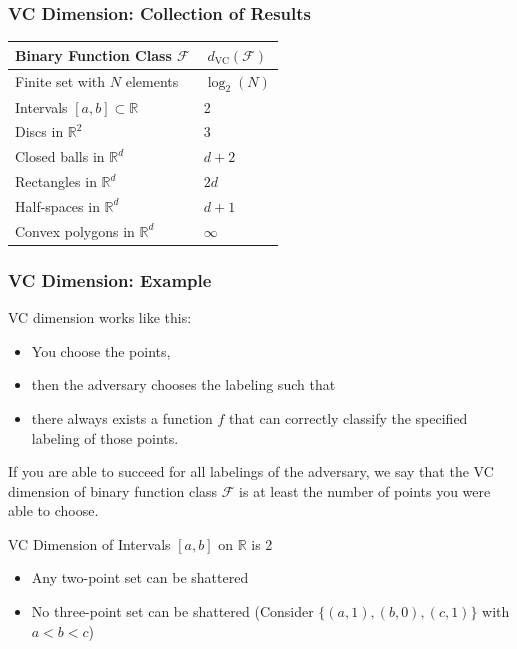 \documentclass{beamer}
\begin{document}

\begin{frame}
\frametitle{VC Dimension: Collection of Results} 

\begin{table}[]
\begin{tabular}{@{}ll@{}}
\toprule
\multicolumn{1}{c}{Binary Function Class $\mathcal{F}$} & \multicolumn{1}{c}{$d_{\text{VC}}(\mathcal{F})$} \\ \midrule
Finite set with $N$ elements & $\log_2(N)$ \\
Intervals $[a,b] \subset \mathbb{R}$ & 2 \\
Discs in $\mathbb{R}^2$ & 3 \\
Closed balls in $\mathbb{R}^d$ & $d+2$ \\
Rectangles in $\mathbb{R}^d$ & $2d$ \\
Half-spaces in $\mathbb{R}^d$ & $d+1$ \\
Convex polygons in $\mathbb{R}^d$ & $\infty$ \\ \bottomrule
\end{tabular}
\end{table}

\end{frame}


\begin{frame}
\frametitle{VC Dimension: Example} 

VC dimension works like this: 
\begin{itemize}
    \item You choose the points, 
    \item then the adversary chooses the labeling such that 
    \item there always exists a function $f$ that can correctly classify the specified labeling of those points.
\end{itemize}
If you are able to succeed for all labelings of the adversary, we say that the VC dimension of binary function class $\mathcal{F}$ is at least the number of points you were able to choose.
\begin{block}{VC Dimension of Intervals $[a, b]$ on $\mathbb{R}$ is 2}
\begin{itemize}
    \item Any two-point set can be shattered  
    \item No three-point set can be shattered (Consider $\{(a, 1), (b, 0), (c, 1)\}$ with $a < b < c$)
\end{itemize}
\end{block}

\end{frame}
\end{document}
